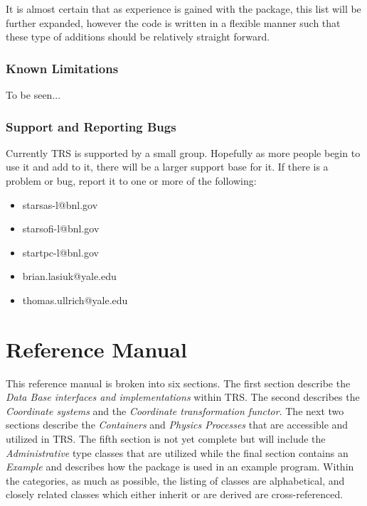 \documentclass[twoside]{article}
\newcommand{\name}[1]{\textsf{#1}}%
\begin{document}
It is almost certain that as
experience is gained with the package, this list will be further
expanded, however the code is written in a flexible manner such that
these type of additions should be relatively straight forward.

\section{Known Limitations} 

To be seen... 

\section{Support and Reporting Bugs} 

Currently \name{TRS} is supported by a small group.  Hopefully
as more people begin to use it and add to it, there will be a larger
support base for it.  If there is a problem or bug, report it to
one or more of the following:
\begin{itemize}
  \item starsas-l@bnl.gov
  \item starsofi-l@bnl.gov
  \item startpc-l@bnl.gov
  \item brian.lasiuk@yale.edu
  \item thomas.ullrich@yale.edu
\end{itemize}

\clearpage

%
%
\part{Reference Manual}
\clearpage

This reference manual is broken into six sections.  The first 
section describe the {\em Data Base interfaces and implementations} 
within \name{TRS}.  The second describes the {\em Coordinate systems} and the
{\em Coordinate transformation functor}.  The next two sections describe
the {\em Containers} and {\em Physics Processes} that are accessible and
utilized in \name{TRS}.  The fifth section is not yet complete but
will include the {\em Administrative} type
classes that are utilized while the final section contains
an {\em Example} and describes how
the package is used in an example program.  Within the categories,
as much as possible, the listing of classes are alphabetical, and
closely related classes which either inherit or are derived are
cross-referenced.  
\end{document}
